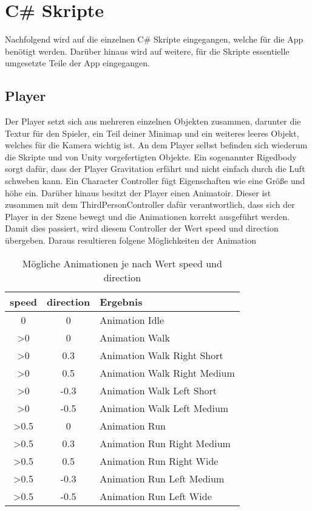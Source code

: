 \section{C\# Skripte}
	Nachfolgend wird auf die einzelnen C\# Skripte eingegangen, welche für die App benötigt werden. Darüber hinaus wird auf weitere, für die Skripte essentielle umgesetzte Teile der App eingegangen.

\subsection{Player}
	Der Player setzt sich aus mehreren einzelnen Objekten zusammen, darunter die Textur für den Spieler, ein Teil deiner Minimap und ein weiteres leeres Objekt, welches für die Kamera wichtig ist. An dem Player selbst befinden sich wiederum die Skripte und von Unity vorgefertigten Objekte. Ein sogenannter Rigedbody sorgt dafür, dass der Player Gravitation erfährt und nicht einfach durch die Luft schweben kann. Ein Character Controller fügt Eigenschaften wie eine Größe und höhe ein. Darüber hinaus besitzt der Player einen Animatoir. Dieser ist zusammen mit dem ThirdPersonController dafür verantwortlich, dass sich der Player in der Szene bewegt und die Animationen korrekt ausgeführt werden. Damit dies passiert, wird diesem Controller der Wert speed und direction übergeben. Daraus resultieren folgene Möglichkeiten der Animation

 \begin{table}[htbp]
 \begin{tabular}{|c|c|l|}
 \hline
  speed & direction & Ergebnis \\
 \hline
  0 & 0 & Animation Idle \\
  >0 & 0 & Animation Walk \\
  >0 & 0.3 & Animation Walk Right Short \\
  >0 & 0.5 & Animation Walk Right Medium \\
  >0 & -0.3 & Animation Walk Left Short \\
  >0 & -0.5 & Animation Walk Left Medium \\
  >0.5 & 0 & Animation Run \\
  >0.5 & 0.3 & Animation Run Right Medium \\
  >0.5 & 0.5 & Animation Run Right Wide \\
  >0.5 & -0.3 & Animation Run Left Medium \\
  >0.5 & -0.5 & Animation Run Left Wide \\ \hline
 \end{tabular}
  \caption{Mögliche Animationen je nach Wert speed und direction}
 \label{tab:tabspeeddirection}
 \end{table}
 
